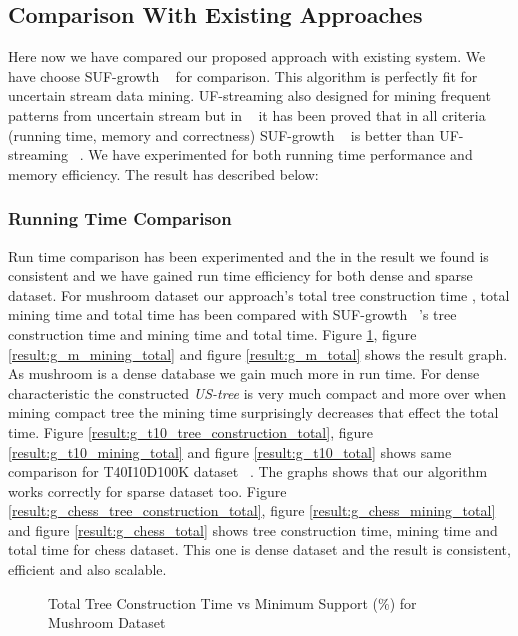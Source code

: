 \subsection{Comparison With Existing Approaches}
Here now we have compared our proposed approach with existing system. We have choose SUF-growth ~\cite{suf_growth}  for comparison. This algorithm is perfectly fit for uncertain stream data mining. UF-streaming also designed for mining frequent patterns from uncertain stream but in ~\cite{suf_growth} it has been proved that in all criteria (running time, memory and correctness) SUF-growth ~\cite{suf_growth} is better than UF-streaming ~\cite{suf_growth}. We have experimented for both running time performance and memory efficiency. The result has described below:
	\subsubsection{Running Time Comparison}
	Run time comparison has been experimented and the in the result we found is consistent and we have gained run time efficiency for both dense and sparse dataset. For mushroom dataset our approach's total tree construction time , total mining time and total time has been compared with SUF-growth ~\cite{suf_growth}'s tree construction time and mining time and total time. Figure \ref{result:g_m_tree_construction_total}, figure \ref{result:g_m_mining_total} and figure \ref{result:g_m_total} shows the result graph. As mushroom is a dense database we gain much more in run time. For dense characteristic the constructed \emph{US-tree} is very much compact and more over when mining compact tree the mining time surprisingly decreases that effect the total time. Figure \ref{result:g_t10_tree_construction_total}, figure \ref{result:g_t10_mining_total} and figure \ref{result:g_t10_total} shows same comparison for T40I10D100K dataset ~\cite{dataset}. The graphs shows that our algorithm works correctly for sparse dataset too. Figure \ref{result:g_chess_tree_construction_total}, figure \ref{result:g_chess_mining_total} and figure \ref{result:g_chess_total} shows tree construction time, mining time and total time for chess dataset. This one is dense dataset and the result is consistent, efficient and also scalable.
			\begin{figure}[h]
			\centering
				
			\caption{Total Tree Construction Time vs Minimum Support (\%) for Mushroom Dataset ~\cite{dataset}}
			\label{result:g_m_tree_construction_total}
			\end{figure}
			
